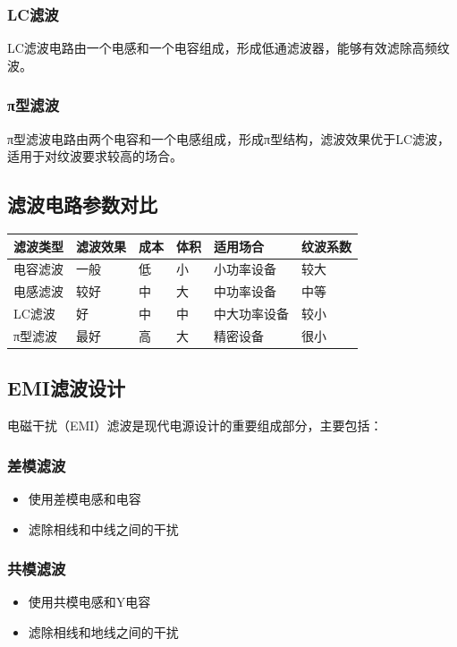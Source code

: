 \documentclass[12pt,UTF8]{ctexbook}
\begin{document}
\subsubsection{LC滤波}

LC滤波电路由一个电感和一个电容组成，形成低通滤波器，能够有效滤除高频纹波。

\subsubsection{π型滤波}

π型滤波电路由两个电容和一个电感组成，形成π型结构，滤波效果优于LC滤波，适用于对纹波要求较高的场合。

\subsection{滤波电路参数对比}

\begin{tabular}{|l|l|l|l|l|l|}
\hline
滤波类型 & 滤波效果 & 成本 & 体积 & 适用场合 & 纹波系数 \\
\hline
电容滤波 & 一般 & 低 & 小 & 小功率设备 & 较大 \\
\hline
电感滤波 & 较好 & 中 & 大 & 中功率设备 & 中等 \\
\hline
LC滤波 & 好 & 中 & 中 & 中大功率设备 & 较小 \\
\hline
π型滤波 & 最好 & 高 & 大 & 精密设备 & 很小 \\
\hline
\end{tabular}

\subsection{EMI滤波设计}

电磁干扰（EMI）滤波是现代电源设计的重要组成部分，主要包括：

\subsubsection{差模滤波}
\begin{itemize}
    \item 使用差模电感和电容
    \item 滤除相线和中线之间的干扰
\end{itemize}

\subsubsection{共模滤波}
\begin{itemize}
    \item 使用共模电感和Y电容
    \item 滤除相线和地线之间的干扰
\end{itemize}
\end{document}
